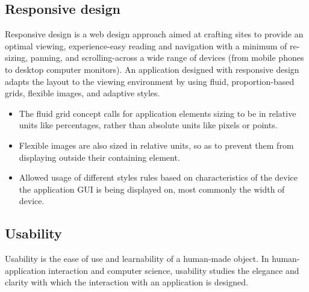 \subsection {Responsive design}
	Responsive design \cite{ wiki:RWD, CSS3} is a web design approach aimed at crafting sites to provide an optimal viewing, experience-easy reading and navigation with a minimum of re-sizing, panning, and scrolling-across a wide range of devices (from mobile phones to desktop computer monitors). An application designed with responsive design\cite{pettit, ethan} adapts the layout to the viewing environment by using fluid, proportion-based grids, flexible images, and adaptive styles.
    \begin{itemize}
	\item The fluid grid concept calls for application elements sizing to be in relative units like percentages, rather than absolute units like pixels or points. 
	\item Flexible images are also sized in relative units, so as to prevent them from displaying outside their containing element. 
	\item Allowed usage of different styles rules based on characteristics of the device the application GUI is being displayed on, most commonly the width of device. 
	\end{itemize}

\subsection {Usability}
     Usability is the ease of use and learnability of a human-made object. In human-application interaction and computer science, usability studies the elegance and clarity with which the interaction with an application is designed.

